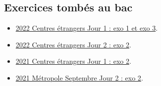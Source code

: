 \documentclass[
  letterpaper,
  DIV=11,
  numbers=noendperiod]{scrartcl}
\providecommand{\tightlist}{%
  \setlength{\itemsep}{0pt}\setlength{\parskip}{0pt}}\usepackage{longtable,booktabs,array}
\begin{document}
\hypertarget{fa-solid-pencil-alt-exercices-tombuxe9s-au-bac}{%
\subsection{\texorpdfstring{ Exercices tombés au
bac}{ Exercices tombés au bac}}\label{fa-solid-pencil-alt-exercices-tombuxe9s-au-bac}}

\begin{itemize}
\tightlist
\item
  \href{../annales/2022_CentresEtrangers_1.pdf}{2022 Centres étrangers
  Jour 1 : exo 1 et exo 3}.
\item
  \href{../annales/2022_CentresEtrangers_2.pdf}{2022 Centres étrangers
  Jour 2 : exo 2}.
\item
  \href{../annales/2021_CentresEtrangers_1.pdf}{2021 Centres étrangers
  Jour 1 : exo 2}.
\item
  \href{../annales/2021_Metropole_Septembre_2.pdf}{2021 Métropole
  Septembre Jour 2 : exo 2}.
\end{itemize}
\end{document}
